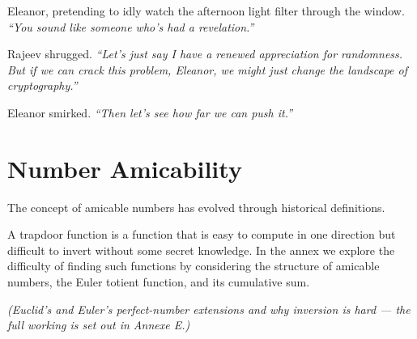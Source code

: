 Eleanor, pretending to idly watch the afternoon light filter through the window. \textit{“You sound like someone who’s had a revelation.”}
\bigskip

Rajeev shrugged. \textit{“Let’s just say I have a renewed appreciation for randomness. But if we can crack this problem, Eleanor, we might just change the landscape of cryptography.”}

Eleanor smirked. \textit{“Then let’s see how far we can push it.”}

\bigskip

\section*{Number Amicability}

The concept of amicable numbers has evolved through historical definitions.

A trapdoor function is a function that is easy to compute in one direction but difficult to invert without some secret knowledge. In the annex we explore the difficulty of finding such functions by considering the structure of amicable numbers, the Euler totient function, and its cumulative sum.

\textit{(Euclid's and Euler's perfect-number extensions and why inversion is hard --- the full working is set out in Annexe E.)}

